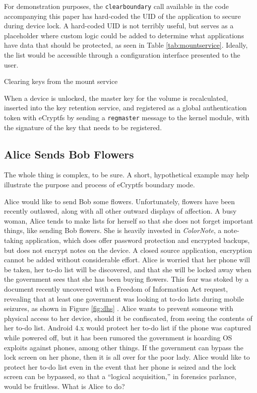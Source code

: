 For demonstration purposes, the \texttt{clearboundary} call available in the code accompanying this paper has hard-coded the UID of
the application to secure during device lock. A hard-coded UID is not terribly useful, but serves as a placeholder where custom
logic could be added to determine what applications have data that should be protected, as seen in Table \ref{tab:mountservice}.
Ideally, the list would be accessible through a configuration interface presented to the user.

\begin{table}[htb]

\caption{Clearing keys from the mount service}
\label{tab:mountservice}
\end{table}

When a device is unlocked, the master key for the volume is recalculated, inserted into the key retention service, and registered
as a global authentication token with eCryptfs by sending a \texttt{regmaster} message to the kernel module, with the signature of
the key that needs to be registered. 

\subsection{Alice Sends Bob Flowers}
\label{sec:alicebob}
The whole thing is complex, to be sure. A short, hypothetical example may help illustrate the purpose and process of eCryptfs boundary mode.  

Alice would like to send Bob some flowers. Unfortunately, flowers have been recently outlawed, along with all other outward displays
of affection. A busy woman, Alice tends to make lists for herself so that she does not forget important things, like sending Bob
flowers. She is heavily invested in \emph{ColorNote}, a note-taking application, which does offer password protection and encrypted
backups, but does not encrypt notes on the device. A closed source application, encryption cannot be added without considerable
effort. Alice is worried that her phone will be taken, her to-do list will be discovered, and that she will be locked away when the
government sees that she has been buying flowers. This fear was stoked by a document recently uncovered with a Freedom of
Information Act request, revealing that at least one government was looking at to-do lists during mobile seizures, as shown in
Figure \ref{fig:dhs} \cite{dhsfoia}. Alice wants to prevent someone with physical access to her device, should it be confiscated,
from seeing the contents of her to-do list. Android 4.x would protect her to-do list if the phone was captured while powered off, but
it has been rumored the government is hoarding OS exploits against phones, among other things. If the government can bypass the lock
screen on her phone, then it is all over for the poor lady. Alice would like to protect her to-do list even in the event that her
phone is seized and the lock screen can be bypassed, so that a ``logical acquisition,'' in forensics parlance, would be fruitless.
What is Alice to do?

